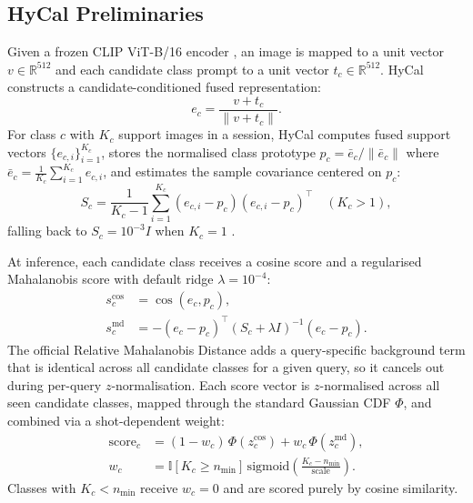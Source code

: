 \documentclass[letterpaper]{article} %
\newcommand{\nmin}{n_{\min}}
\begin{document}
\subsection{HyCal Preliminaries}

Given a frozen CLIP ViT-B/16 encoder \citep{radford2021clip}, an image is mapped to a unit vector $v \in \mathbb{R}^{512}$ and each candidate class prompt to a unit vector $t_c \in \mathbb{R}^{512}$. HyCal \citep{lee2026hycal} constructs a candidate-conditioned fused representation:
\begin{equation}
e_c = \frac{v + t_c}{\lVert v + t_c \rVert}.
\label{eq:fusion}
\end{equation}
For class $c$ with $K_c$ support images in a session, HyCal computes fused support vectors $\{e_{c,i}\}_{i=1}^{K_c}$, stores the normalised class prototype $p_c = \bar{e}_c / \lVert \bar{e}_c \rVert$ where $\bar{e}_c = \frac{1}{K_c}\sum_{i=1}^{K_c} e_{c,i}$, and estimates the sample covariance centered on $p_c$:
\begin{equation}
S_c = \frac{1}{K_c - 1} \sum_{i=1}^{K_c} (e_{c,i} - p_c)(e_{c,i} - p_c)^\top \quad (K_c > 1),
\label{eq:cov}
\end{equation}
falling back to $S_c = 10^{-3} I$ when $K_c = 1$ \citep{hycalcode}.

At inference, each candidate class receives a cosine score and a regularised Mahalanobis score with default ridge $\lambda = 10^{-4}$:
\begin{equation}
\begin{split}
s^{\mathrm{cos}}_c &= \cos(e_c, p_c),\\
s^{\mathrm{md}}_c &= -(e_c - p_c)^\top (S_c + \lambda I)^{-1} (e_c - p_c).
\end{split}
\label{eq:scores}
\end{equation}
The official Relative Mahalanobis Distance adds a query-specific background term that is identical across all candidate classes for a given query, so it cancels out during per-query $z$-normalisation. Each score vector is $z$-normalised across all seen candidate classes, mapped through the standard Gaussian CDF $\Phi$, and combined via a shot-dependent weight:
\begin{equation}
\begin{split}
\mathrm{score}_c &= (1 - w_c)\,\Phi(z^{\mathrm{cos}}_c) + w_c\,\Phi(z^{\mathrm{md}}_c),\\
w_c &= \mathbb{I}[K_c \ge \nmin]\,\mathrm{sigmoid}\!\left(\frac{K_c - \nmin}{\mathrm{scale}}\right).
\end{split}
\label{eq:combine}
\end{equation}
Classes with $K_c < \nmin$ receive $w_c = 0$ and are scored purely by cosine similarity.
\end{document}
